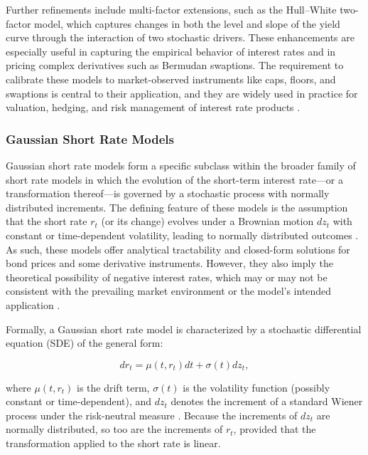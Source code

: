 Further refinements include multi-factor extensions, such as the Hull–White two-factor model, which captures changes in both the level and slope of the yield curve through the interaction of two stochastic drivers. These enhancements are especially useful in capturing the empirical behavior of interest rates and in pricing complex derivatives such as Bermudan swaptions. The requirement to calibrate these models to market-observed instruments like caps, floors, and swaptions is central to their application, and they are widely used in practice for valuation, hedging, and risk management of interest rate products \parencite[p.~719]{hull2015optionsfutures}.

\subsubsection{Gaussian Short Rate Models} \label{gaussian_short_rate_models}
Gaussian short rate models form a specific subclass within the broader family of short rate models in which the evolution of the short-term interest rate—or a transformation thereof—is governed by a stochastic process with normally distributed increments. The defining feature of these models is the assumption that the short rate $r_t$ (or its change) evolves under a Brownian motion $dz_t$ with constant or time-dependent volatility, leading to normally distributed outcomes \parencite[p.~53]{brigo2006interest}. As such, these models offer analytical tractability and closed-form solutions for bond prices and some derivative instruments. However, they also imply the theoretical possibility of negative interest rates, which may or may not be consistent with the prevailing market environment or the model’s intended application \parencite[pp.~719--720]{hull2015optionsfutures}.

Formally, a Gaussian short rate model is characterized by a stochastic differential equation (SDE) of the general form:

\begin{equation}
	dr_t = \mu(t, r_t) dt + \sigma(t) dz_t,
\end{equation}


where $\mu(t, r_t)$ is the drift term, $\sigma(t)$ is the volatility function (possibly constant or time-dependent), and $dz_t$ denotes the increment of a standard Wiener process under the risk-neutral measure \parencite[p.~53]{brigo2006interest}. Because the increments of $dz_t$ are normally distributed, so too are the increments of $r_t$, provided that the transformation applied to the short rate is linear.

